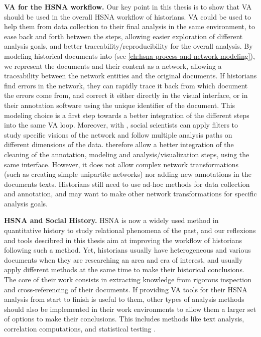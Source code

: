 \noindent\textbf{VA for the HSNA workflow.} Our key point in this thesis is to show that VA should be used in the overall HSNA workflow of historians.
VA could be used to help them from data collection to their final analysis in the same environment, to ease back and forth between the steps, allowing easier exploration of different analysis goals, and better traceability/reproducibility for the overall analysis.
By modeling historical documents into \modelplural (see \autoref{ch:hsna-process-and-network-modeling}), we represent the documents and their content as a network, allowing a traceability between the network entities and the original documents.
If historians find errors in the network, they can rapidly trace it back from which document the errors come from, and correct it either directly in the visual interface, or in their annotation software using the unique identifier of the document.
This modeling choice is a first step towards a better integration of the different steps into the same VA loop.
Moreover, with \name, social scientists can apply filters to study specific visions of the network and follow multiple analysis paths on different dimensions of the data.
\name therefore allow a better integration of the cleaning of the annotation, modeling and analysis/visualization steps, using the same interface.
However, it does not allow complex network transformations (such as creating simple unipartite networks) nor adding new annotations in the documents texts.
Historians still need to use ad-hoc methods for data collection and annotation, and may want to make other network transformations for specific analysis goals.



\noindent\textbf{HSNA and Social History.} HSNA is now a widely used method in quantitative history to study relational phenomena of the past, and our reflexions and tools descibred in this thesis aim at improving the workflow of historians following such a method.
Yet, historians usually have heterogeneous and various documents when they are researching an area and era of interest, and usually apply different methods at the same time to make their historical conclusions.
The core of their work consists in extracting knowledge from rigorous inspection and cross-referencing of their documents.
If providing VA tools for their HSNA analysis from start to finish is useful to them, other types of analysis methods should also be implemented in their work environments to allow them a larger set of options to make their conclusions.
This includes methods like text analysis, correlation computations, and statistical testing \cite{lemercierQuantitativeMethodsHumanities2019}.


